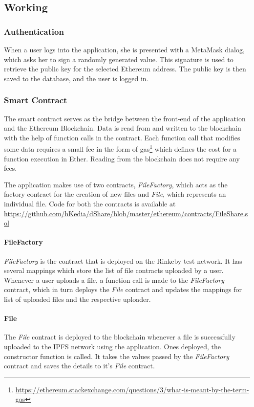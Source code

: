 \subsection{Working}
\subsubsection{Authentication}
When a user logs into the application, she is presented with a MetaMask dialog, which asks her to sign a randomly generated value. This signature is used to retrieve the public key for the selected Ethereum address. The public key is then saved to the database, and the user is logged in.

\subsubsection{Smart Contract}
The smart contract serves as the bridge between the front-end of the application and the Ethereum Blockchain. Data is read from and written to the blockchain with the help of function calls in the contract. Each function call that modifies some data requires a small fee in the form of gas\footnote{\url{https://ethereum.stackexchange.com/questions/3/what-is-meant-by-the-term-gas}} which defines the cost for a function execution in Ether. Reading from the blockchain does not require any fees.

The application makes use of two contracts, \textit{FileFactory}, which acts as the factory contract for the creation of new files and \textit{File}, which represents an individual file. Code for both the contracts is available at \url{https://github.com/hKedia/dShare/blob/master/ethereum/contracts/FileShare.sol}

\paragraph{FileFactory}
\textit{FileFactory} is the contract that is deployed on the Rinkeby test network. It has several mappings which store the list of file contracts uploaded by a user. Whenever a user uploads a file, a function call is made to the \textit{FileFactory} contract, which in turn deploys the \textit{File} contract and updates the mappings for list of uploaded files and the respective uploader.

\paragraph{File}
The \textit{File} contract is deployed to the blockchain whenever a file is successfully uploaded to the IPFS network using the application. Ones deployed, the constructor function is called. It takes the values passed by the \textit{FileFactory} contract and saves the details to it’s \textit{File} contract.

